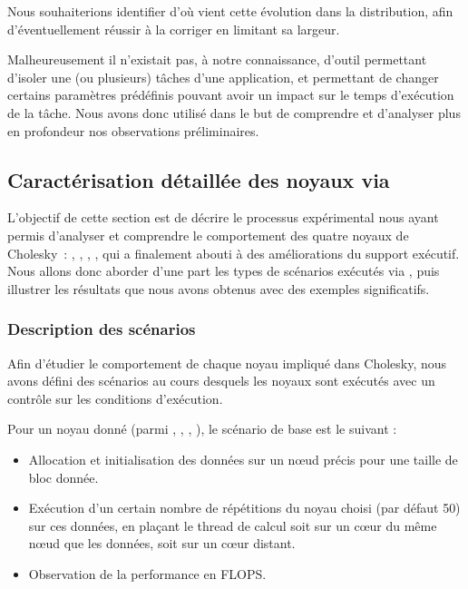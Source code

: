 Nous souhaiterions identifier d'où vient cette évolution dans la distribution, afin d'éventuellement réussir à la corriger en limitant sa largeur.

Malheureusement il n'existait pas, à notre connaissance, d'outil permettant d'isoler une (ou plusieurs) tâches d'une application, et permettant de changer certains paramètres prédéfinis pouvant avoir un impact sur le temps d'exécution de la tâche.
Nous avons donc utilisé \outil dans le but de comprendre et d'analyser plus en profondeur nos observations préliminaires.

\subsection{Caractérisation détaillée des noyaux via \outil}\label{sec:contribs:apps:cholesky:carton}

L'objectif de cette section est de décrire le processus expérimental nous ayant permis d'analyser et comprendre le comportement des quatre noyaux de Cholesky~: \potrf, \trsm, \syrk, \gemm, qui a finalement abouti à des améliorations du support exécutif.
Nous allons donc aborder d'une part les types de scénarios exécutés via \outil, puis illustrer les résultats que nous avons obtenus avec des exemples significatifs.

\subsubsection{Description des scénarios}\label{sec:contribs:apps:cholesky:scenario}

Afin d'étudier le comportement de chaque noyau impliqué dans Cholesky, nous avons défini des scénarios au cours desquels les noyaux sont exécutés avec un contrôle sur les conditions d'exécution.

Pour un noyau donné (parmi \potrf, \trsm, \syrk, \gemm), le scénario de base est le suivant :
\begin{itemize}
  \item Allocation et initialisation des données sur un nœud précis pour une taille de bloc donnée.
  \item Exécution d'un certain nombre de répétitions du noyau choisi (par défaut 50) sur ces données, en plaçant le thread de calcul soit sur un cœur du même nœud que les données, soit sur un cœur distant.
  \item Observation de la performance en FLOPS.
\end{itemize}

